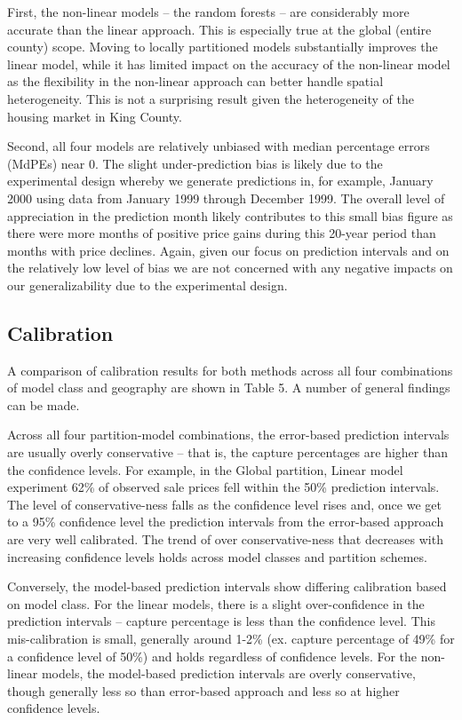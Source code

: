 \documentclass[colTwo]{anon}
\theoremstyle{definition}
\begin{document}
First, the non-linear models -- the random forests -- are considerably more accurate than the linear approach. This is especially true at the global (entire county) scope.  Moving to locally partitioned models substantially improves the linear model, while it has limited impact on the accuracy of the non-linear model as the flexibility in the non-linear approach can better handle spatial heterogeneity.  This is not a surprising result given the heterogeneity of the housing market in King County.  

Second, all four models are relatively unbiased with median percentage errors (MdPEs) near 0.  The slight under-prediction bias is likely due to the experimental design whereby we generate predictions in, for example, January 2000 using data from January 1999 through December 1999.  The overall level of appreciation in the prediction month likely contributes to this small bias figure as there were more months of positive price gains during this 20-year period than months with price declines.  Again, given our focus on prediction intervals and on the relatively low level of bias we are not concerned with any negative impacts on our generalizability due to the experimental design. 

\subsection{Calibration}

A comparison of calibration results for both methods across all four combinations of model class and geography are shown in Table 5.  A number of general findings can be made.  

Across all four partition-model combinations, the error-based prediction intervals are usually overly conservative -- that is, the capture percentages are higher than the confidence levels.  For example, in the Global partition, Linear model experiment 62\% of observed sale prices fell within the 50\% prediction intervals.  The level of conservative-ness falls as the confidence level rises and, once we get to a 95\% confidence level the prediction intervals from the error-based approach are very well calibrated.  The trend of over conservative-ness that decreases with increasing confidence levels holds across model classes and partition schemes.  

Conversely, the model-based prediction intervals show differing calibration based on model class.  For the linear models, there is a slight over-confidence in the prediction intervals -- capture percentage is less than the confidence level.  This mis-calibration is small, generally around 1-2\% (ex. capture percentage of 49\% for a confidence level of 50\%) and holds regardless of confidence levels. For the non-linear models, the model-based prediction intervals are overly conservative, though generally less so than error-based approach and less so at higher confidence levels. 
\end{document}
